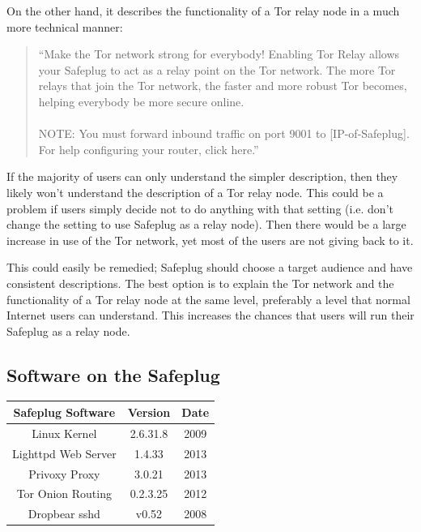 \documentclass[conference]{IEEEtran}
\begin{document}
On the other hand, it describes the functionality of a Tor relay node in a much more technical manner:
\begin{quotation}
``Make the Tor network strong for everybody! Enabling Tor Relay allows your Safeplug to act as a relay point on the Tor network. The more Tor relays that join the Tor network, the faster and more robust Tor becomes, helping everybody be more secure online. \\ \\ NOTE: You must forward inbound traffic on port 9001 to [IP-of-Safeplug]. \\ For help configuring your router, click here.''
\cite{safeplug}
\end{quotation}

If the majority of users can only understand the simpler description, then they likely won't understand the description of a Tor relay node.  This could be a problem if users simply decide not to do anything with that setting (i.e. don't change the setting to use Safeplug as a relay node).  Then there would be a large increase in use of the Tor network, yet most of the users are not giving back to it.

This could easily be remedied; Safeplug should choose a target audience and have consistent descriptions.  The best option is to explain the Tor network and the functionality of a Tor relay node at the same level, preferably a level that normal Internet users can understand.  This increases the chances that users will run their Safeplug as a relay node.

\subsection{Software on the Safeplug}

\begin{center}
	\begin{tabular}{|c|c|c|}
	\hline
		Safeplug Software 	& Version 		& Date \\ \hline
		Linux Kernel				& 2.6.31.8 	& 2009 \\ \hline
		Lighttpd Web Server & 1.4.33			& 2013 \\ \hline
		Privoxy Proxy				& 3.0.21			& 2013 \\ \hline
		Tor Onion Routing		& 0.2.3.25		& 2012 \\ \hline
		Dropbear sshd				& v0.52			& 2008 \\ \hline
	\end{tabular}
\end{center}
\end{document}
